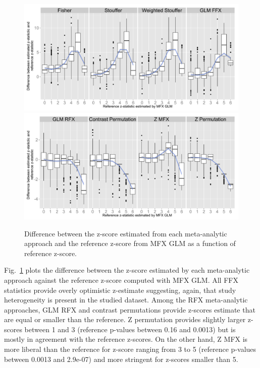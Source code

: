 \documentclass{llncs}
\begin{document}
\begin{figure}[t]
	\centering
	\includegraphics[width=0.8\linewidth]{./MICCAI_version/Rplot_realdata_ffx.pdf}
	\includegraphics[width=0.8\linewidth]{./MICCAI_version/Rplot_realdata_rfx.pdf}
	\caption{Difference between the z-score estimated from each meta-analytic approach and the reference z-score from MFX GLM as a function of reference z-score.}
	\label{fig_realdata}
\end{figure}


Fig.~\ref{fig_realdata} plots the difference between the z-score estimated by each meta-analytic approach against the reference z-score computed with MFX GLM. All FFX statistics provide overly optimistic z-estimate suggesting, again, that study heterogeneity is present in the studied dataset.
Among the RFX meta-analytic approaches, GLM RFX and contrast permutations provide z-scores estimate that are equal or smaller than the reference. Z permutation provides slightly larger z-scores between 1 and 3 (reference p-values between 0.16 and 0.0013) but is mostly in agreement with the reference z-scores. On the other hand, Z MFX is more liberal than the reference for z-score ranging from 3 to 5 (reference p-values between 0.0013 and 2.9e-07) and more stringent for z-scores smaller than 5.

\end{document}
